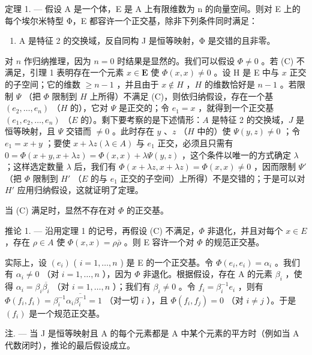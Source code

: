 定理 1. --- 假设 A 是一个体，E 是 A 上有限维数为 n 的向量空间。则对 E 上的每个埃尔米特型 Φ，E 都容许一个正交基，除非下列条件同时满足：

\begin{enumerate}
\def\labelenumi{(\Alph{enumi})}
\setcounter{enumi}{2}
\tightlist
\item
  A 是特征 2 的交换域，反自同构 J 是恒等映射，Φ 是交错的且非零。
\end{enumerate}

对 \(n\) 作归纳推理，因为 \(n=0\) 时结果是显然的。我们可以假设 \(\Phi\neq0\) 。若 (C) 不满足，引理 1 表明存在一个元素 \(x\in\mathbf{E}\) 使 \(\Phi(x,x)\neq0\) 。设 H 是 E 中与 \(x\) 正交的子空间；它的维数 \(\geqslant n-1\) ，并且由于 \(x \notin H\) ，\(H\) 的维数恰好是 \(n-1\) 。若限制 \(\Psi\) （把 \(\Phi\) 限制到 \(H\) 上所得）不满足 (C)，则依归纳假设，存在一个基 \((e_2, \ldots, e_n)\) （\(H\) 的），它对 \(\Psi\) 是正交的；令 \(e_1 = x\) ，就得到一个正交基 \((e_1, e_2, \ldots, e_n)\) （\(E\) 的）。剩下要考察的是下述情形：\(A\) 是特征 2 的交换域，\(J\) 是恒等映射，且 \(\Psi\) 交错而 \(\neq 0\) 。此时存在 \(y\) 、\(z\) （\(H\) 中的）使 \(\Psi(y, z) \neq 0\) ；令 \(e_1 = x + y\) ；要使 \(x + \lambda z (\lambda \in A)\) 与 \(e_1\) 正交，必须且只需有 \(0 = \Phi(x + y, x + \lambda z) = \Phi(x, x) + \lambda \Psi(y, z)\) ，这个条件以唯一的方式确定 \(\lambda\) ；这样选定数量 \(\lambda\) 后，我们有 \(\Phi(x + \lambda z, x + \lambda z) = \Phi(x, x) \neq 0\) ，因而限制 \(\Psi'\) （把 \(\Phi\) 限制到 \(H'\) （\(E\) 的与 \(e_1\) 正交的子空间）上所得）不是交错的；于是可以对 \(H'\) 应用归纳假设，这就证明了定理。

当 (C) 满足时，显然不存在对 \(\Phi\) 的正交基。

推论 1. --- 沿用定理 1 的记号，再假设 (C) 不满足，\(\Phi\) 非退化，并且对每个 \(x \in E\) ，存在 \(\rho \in A\) 使 \(\Phi(x, x) = \rho \bar{\rho}\) 。则 E 容许一个对 \(\Phi\) 的规范正交基。

实际上，设 \((e_i)\) ( \(i = 1, \ldots, n\) ) 是 E 的一个正交基。令 \(\Phi(e_i, e_i) = \alpha_i\) 。我们有 \(\alpha_i \neq 0\) （对 \(i = 1, \ldots, n\) ），因为 \(\Phi\) 非退化。根据假设，存在 A 的元素 \(\beta_i\) ，使得 \(\alpha_i = \beta_i \overline{\beta_i}\) （对 \(i = 1, \ldots, n\) ）；我们有 \(\beta_i \neq 0\) 。令 \(f_i = \beta_i^{-1} e_i\) ，则有 \(\Phi(f_i, f_i) = \beta_i^{-1} \alpha_i \overline{\beta_i^{-1}} = 1\) （对一切 \(i\) ），且 \(\Phi(f_i, f_j) = 0\) （对 \(i \neq j\) ）。于是 \((f_i)\) 是一个规范正交基。

注. --- 当 J 是恒等映射且 A 的每个元素都是 A 中某个元素的平方时（例如当 A 代数闭时），推论的最后假设成立。

